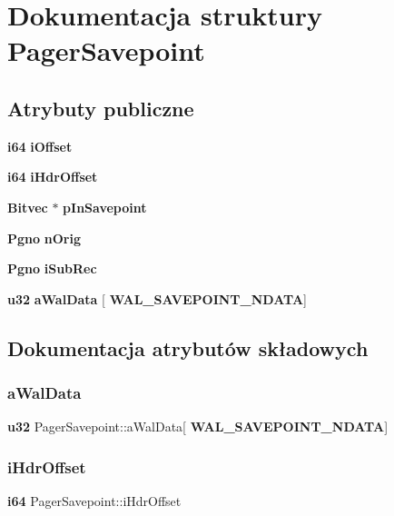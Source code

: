 \section{Dokumentacja struktury Pager\+Savepoint}
\label{struct_pager_savepoint}
\subsection*{Atrybuty publiczne}
\begin{DoxyCompactItemize}
\item 
\textbf{ i64} \textbf{ i\+Offset}
\item 
\textbf{ i64} \textbf{ i\+Hdr\+Offset}
\item 
\textbf{ Bitvec} $\ast$ \textbf{ p\+In\+Savepoint}
\item 
\textbf{ Pgno} \textbf{ n\+Orig}
\item 
\textbf{ Pgno} \textbf{ i\+Sub\+Rec}
\item 
\textbf{ u32} \textbf{ a\+Wal\+Data} [\textbf{ W\+A\+L\+\_\+\+S\+A\+V\+E\+P\+O\+I\+N\+T\+\_\+\+N\+D\+A\+TA}]
\end{DoxyCompactItemize}


\subsection{Dokumentacja atrybutów składowych}
\mbox{\label{struct_pager_savepoint_ac96cff844a24378c426a9901517f1d6c}} 
\subsubsection{aWalData}
{\footnotesize\ttfamily \textbf{ u32} Pager\+Savepoint\+::a\+Wal\+Data[\textbf{ W\+A\+L\+\_\+\+S\+A\+V\+E\+P\+O\+I\+N\+T\+\_\+\+N\+D\+A\+TA}]}

\mbox{\label{struct_pager_savepoint_ae1afd1cf4fba6f7efd232656366121d1}} 
\subsubsection{iHdrOffset}
{\footnotesize\ttfamily \textbf{ i64} Pager\+Savepoint\+::i\+Hdr\+Offset}

\mbox{\label{struct_pager_savepoint_ab3ee7b75a10f47a82c8e3312bee6ad60}} 
